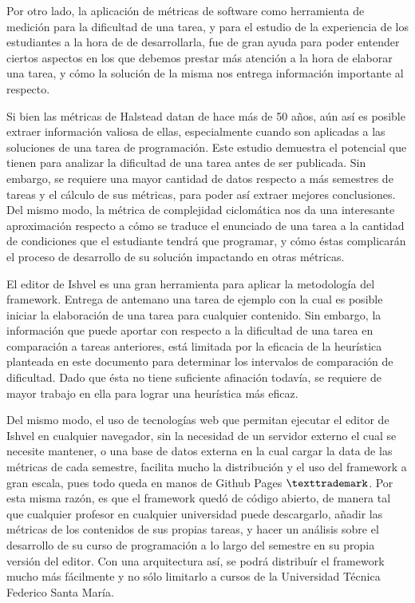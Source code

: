 \documentclass[letterpaper,12pt]{article}
\begin{document}
Por otro lado, la aplicación de métricas de software como herramienta de medición para la dificultad de una tarea, y para el estudio de la experiencia de los estudiantes a la hora de de desarrollarla, fue de gran ayuda para poder entender ciertos aspectos en los que debemos prestar más atención a la hora de elaborar una tarea, y cómo la solución de la misma nos entrega información importante al respecto.

Si bien las métricas de Halstead datan de hace más de 50 años, aún así es posible extraer información valiosa de ellas, especialmente cuando son aplicadas a las soluciones de una tarea de programación. Este estudio demuestra el potencial que tienen para analizar la dificultad de una tarea antes de ser publicada. Sin embargo, se requiere una mayor cantidad de datos respecto a más semestres de tareas y el cálculo de sus métricas, para poder así extraer mejores conclusiones. Del mismo modo, la métrica de complejidad ciclomática nos da una interesante aproximación respecto a cómo se traduce el enunciado de una tarea a la cantidad de condiciones que el estudiante tendrá que programar, y cómo éstas complicarán el proceso de desarrollo de su solución impactando en otras métricas.

El editor de Ishvel es una gran herramienta para aplicar la metodología del framework. Entrega de antemano una tarea de ejemplo con la cual es posible iniciar la elaboración de una tarea para cualquier contenido. Sin embargo, la información que puede aportar con respecto a la dificultad de una tarea en comparación a tareas anteriores, está limitada por la eficacia de la heurística planteada en este documento para determinar los intervalos de comparación de dificultad. Dado que ésta no tiene suficiente afinación todavía, se requiere de mayor trabajo en ella para lograr una heurística más eficaz.

Del mismo modo, el uso de tecnologías web que permitan ejecutar el editor de Ishvel en cualquier navegador, sin la necesidad de un servidor externo el cual se necesite mantener, o una base de datos externa en la cual cargar la data de las métricas de cada semestre, facilita mucho la distribución y el uso del framework a gran escala, pues todo queda en manos de Github Pages $\texttrademark$. Por esta misma razón, es que el framework quedó de código abierto, de manera tal que cualquier profesor en cualquier universidad puede descargarlo, añadir las métricas de los contenidos de sus propias tareas, y hacer un análisis sobre el desarrollo de su curso de programación a lo largo del semestre en su propia versión del editor. Con una arquitectura así, se podrá distribuír el framework mucho más fácilmente y no sólo limitarlo a cursos de la Universidad Técnica Federico Santa María.
\end{document}
